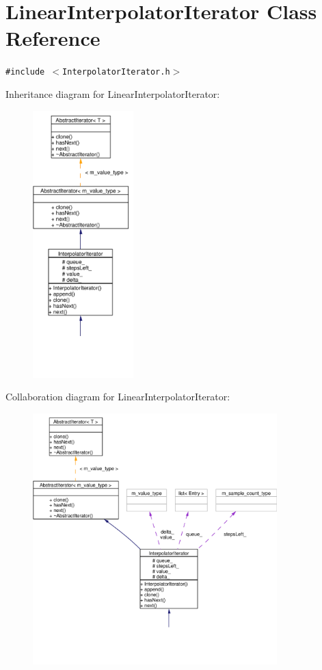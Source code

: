\hypertarget{classLinearInterpolatorIterator}{
\section{Linear\-Interpolator\-Iterator Class Reference}
\label{classLinearInterpolatorIterator}
}
{\tt \#include $<$Interpolator\-Iterator.h$>$}

Inheritance diagram for Linear\-Interpolator\-Iterator:\begin{figure}[H]
\begin{center}
\leavevmode
\includegraphics[width=110pt]{classLinearInterpolatorIterator__inherit__graph}
\end{center}
\end{figure}
Collaboration diagram for Linear\-Interpolator\-Iterator:\begin{figure}[H]
\begin{center}
\leavevmode
\includegraphics[width=268pt]{classLinearInterpolatorIterator__coll__graph}
\end{center}
\end{figure}
